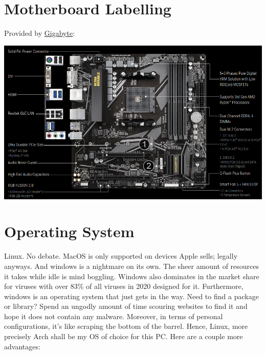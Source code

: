 \documentclass[12pt, a4paper]{article}
\begin{document}
\section{Motherboard Labelling}
Provided by \href{https://www.gigabyte.com/Motherboard/B550M-DS3H-rev-10-11-12-13\#kf}{Gigabyte}:
\vspace{4pt}
\begin{center}
  \includegraphics[scale=0.6]{unga.png}
\end{center}



\section{Operating System}
Linux. No debate. MacOS is only supported on devices Apple sells; legally
anyways. And windows is a nightmare on its own. The sheer amount of resources
it takes while idle is mind boggling. Windows also dominates in the market
share for viruses with over 83\% of all viruses in 2020 designed for it.
Furthermore, windows is an operating system that just gets in the way.
Need to find a package or library? Spend an ungodly amount of time
scouring websites to find it and hope it does not contain any malware.
Moreover, in terms of personal configurations, it's like scraping the 
bottom of the barrel. Hence, Linux, more precisely Arch shall be my OS of
choice for this PC. Here are a couple more advantages:
\end{document}
